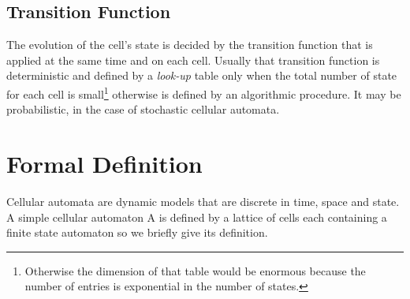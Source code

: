 \subsection{Transition Function}
The evolution of the cell's state is decided by the transition function that
is applied at the same time and on each cell. Usually that transition function
is deterministic and defined by a \textit{look-up} table only when the total
number of state for each cell is small\footnote{Otherwise the dimension of that table would be enormous because the number of entries is exponential in the number of
states.} otherwise is defined by an algorithmic procedure.
It may be probabilistic, in the case of stochastic cellular automata.






\section{Formal Definition}
Cellular automata are dynamic models that are
discrete in time, space and state. A simple cellular
automaton A is defined by a lattice of cells each containing a finite state
automaton so we briefly give its definition.

